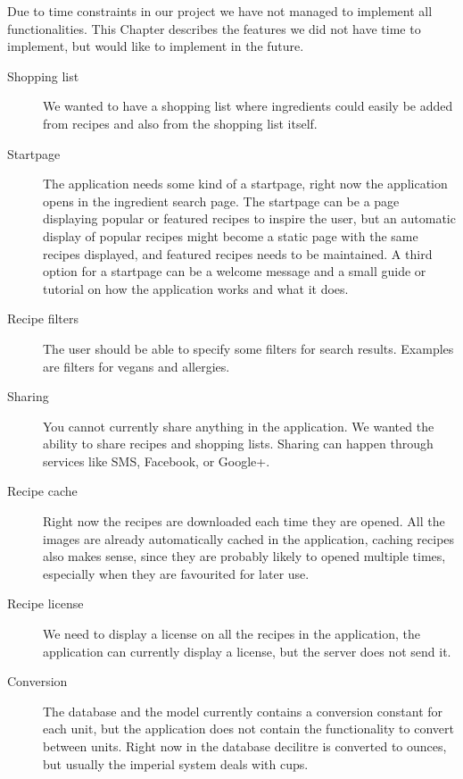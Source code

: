 Due to time constraints in our project we have not managed to implement all functionalities. This Chapter describes the features we did not have time to implement, but would like to implement in the future.

\begin{description}
\item[Shopping list] We wanted to have a shopping list where ingredients could easily be added from recipes and also from the shopping list itself.

\item[Startpage] The application needs some kind of a startpage, right now the application opens in the ingredient search page. The startpage can be a page displaying popular or featured recipes to inspire the user, but an automatic display of popular recipes might become a static page with the same recipes displayed, and featured recipes needs to be maintained. A third option for a startpage can be a welcome message and a small guide or tutorial on how the application works and what it does.

\item[Recipe filters] The user should be able to specify some filters for search results. Examples are filters for vegans and allergies.

\item[Sharing] You cannot currently share anything in the application. We wanted the ability to share recipes and shopping lists. Sharing can happen through services like SMS, Facebook, or Google+.

\item[Recipe cache] Right now the recipes are downloaded each time they are opened. All the images are already automatically cached in the application, caching recipes also makes sense, since they are probably likely to opened multiple times, especially when they are favourited for later use.

\item[Recipe license] We need to display a license on all the recipes in the application, the application can currently display a license, but the server does not send it.

\item[Conversion] The database and the model currently contains a conversion constant for each unit, but the application does not contain the functionality to convert between units. Right now in the database decilitre is converted to ounces, but usually the imperial system deals with cups.


\end{description}
